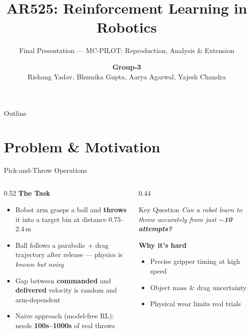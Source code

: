 \documentclass{if-beamer}
\title[Final Presentation]{\Huge\textbf{AR525: Reinforcement Learning in Robotics}}
\subtitle{\Large{Final Presentation --- MC-PILOT: Reproduction, Analysis \& Extension}}
\author[]{
    \large \textbf{Group-3} \\[0.5em]
    \small Rishang Yadav, Bhumika Gupta, Aarya Agarwal, Yajesh Chandra\newline\newline
}
\institute[IIT Mandi]{}
\begin{document}
\begin{frame}
  \titlepage
\end{frame}

\begin{frame}{Outline}
  \tableofcontents
\end{frame}


\section{Problem \& Motivation}

\begin{frame}{Pick-and-Throw Operations}
    \begin{columns}[T]
        \begin{column}{0.52\textwidth}
            \textbf{The Task}
            \begin{itemize}
                \item Robot arm grasps a ball and \textbf{throws} it into a target bin at distance $0.75$--$2.4$\,m
                \item Ball follows a parabolic + drag trajectory after release --- physics is \textit{known but noisy}
                \item Gap between \textbf{commanded} and \textbf{delivered} velocity is random and arm-dependent
                \item Naive approach (model-free RL): needs \textbf{100s--1000s} of real throws
            \end{itemize}
        \end{column}
        \begin{column}{0.44\textwidth}
            \begin{block}{Key Question}
                \centering
                \textit{Can a robot learn to throw accurately from just $\mathbf{\sim}$\textbf{10 attempts?}}
            \end{block}
            \vspace{0.5em}
            \textbf{Why it's hard}
            \begin{itemize}
                \item Precise gripper timing at high speed
                \item Object mass \& drag uncertainty
                \item Physical wear limits real trials
            \end{itemize}
        \end{column}
    \end{columns}
\end{frame}
\end{document}
